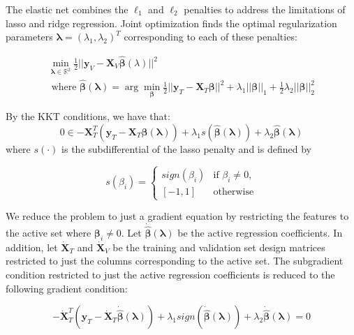 \documentclass[10pt,letterpaper]{article}
\begin{document}
The elastic net combines the $\ell_1$ and $\ell_2$ penalties to address the limitations of lasso and ridge regression. Joint optimization finds the optimal regularization parameters $\boldsymbol{\lambda} = (\lambda_1, \lambda_2)^T$ corresponding to each of these penalties:

\begin{equation}
\begin{array}{c}
\min_{\boldsymbol{\lambda} \in \mathbb{R}^2} \frac{1}{2} \lvert\lvert \boldsymbol{y}_V - \boldsymbol{X}_V \hat{\boldsymbol{\beta}} (\lambda) \rvert\rvert ^2 \\
\text{ where }
\hat{\boldsymbol{\beta}} (\boldsymbol{\lambda}) = \arg \min_{\boldsymbol{\beta}} \frac{1}{2} \lvert\lvert \boldsymbol{y}_T - \boldsymbol{X}_T \boldsymbol{\beta} \rvert\rvert ^2
+ \lambda_1 \lvert\lvert \boldsymbol{\beta} \rvert \rvert_1
+ \frac{1}{2}\lambda_2 \lvert\lvert \boldsymbol{\beta} \rvert \rvert_2^2
\end{array}
\end{equation}

By the KKT conditions, we have that:
\begin{equation}
0 \in -\boldsymbol{X}_T^T(\boldsymbol{y}_T
- \boldsymbol{X}_T \hat{\boldsymbol{\beta}} (\boldsymbol{\lambda}) )
+ \lambda_1 s(\hat{\boldsymbol{\beta}} (\boldsymbol{\lambda}))
+ \lambda_2 \hat{\boldsymbol{\beta}} (\boldsymbol{\lambda})
\end{equation}
where $s(\cdot)$ is the subdifferential of the lasso penalty and is defined by

\begin{equation}
s(\beta_i) = \begin{cases}
  sign(\beta_i) & \text{if } \beta_i \ne 0, \\
  [-1, 1] & \text{otherwise}
\end{cases}
\end{equation}

We reduce the problem to just a gradient equation by restricting the features to the active set where $\boldsymbol \beta_i \ne 0$. Let $\dot{\hat{\boldsymbol{\beta}}}(\boldsymbol \lambda)$ be the active regression coefficients. In addition, let $\dot{\boldsymbol{X}}_T$ and $\dot{\boldsymbol{X}}_V$ be the training and validation set design matrices restricted to just the columns corresponding to the active set. The subgradient condition restricted to just the active regression coefficients is reduced to the following gradient condition:

\begin{equation}
-\dot{\boldsymbol{X}}_T^T(\boldsymbol y_T - \dot{\boldsymbol{X}}_T \dot{\hat{\boldsymbol{\beta}}} (\boldsymbol{\lambda}) )
+ \lambda_1 sign(\dot{\hat{\boldsymbol{\beta}}} (\boldsymbol{\lambda}))
+ \lambda_2 \dot{\hat{\boldsymbol{\beta}}}(\boldsymbol{\lambda}) = 0
\end{equation}
\end{document}
